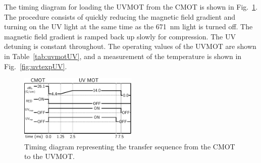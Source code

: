 The timing diagram for loading the UVMOT from the CMOT is shown
in Fig.~\ref{fig:timingUV}.  The procedure consists of quickly reducing the
magnetic field gradient and turning on the UV light at the same time as the
671~nm light is turned off.  The magnetic field gradient is ramped back up
slowly for compression.  The UV detuning is constant throughout.  The
operating values of the UVMOT are shown in Table~\ref{tab:uvmotUV}, and a
measurement of the temperature is shown in Fig.~\ref{fig:uvtexpUV}. 

\begin{figure} \centering
\includegraphics[width=0.5\textwidth]{../masters-figures/323mot/timingdiagram-nodet/timing.pdf}
\caption[UVMOT loading timing diagram]{\small Timing diagram representing the
transfer sequence from the CMOT to the UVMOT. } \label{fig:timingUV}
\end{figure}

\begin{table} \centering 
{}
\caption[UVMOT settings]{\small UVMOT Settings.
$\isat^{3P}=5.9\,\mathrm{mW/cm^{2}}$ is the saturation intensity of the 323~nm
transition.~\cite{Duarte2011}. The two values shown for the detuning correspond
to optimized number and temperature of the UVMOT (Fig.~\ref{fig:uvtexpUV}), and
optimized number of atoms loaded into the ODT.  More details on loading the ODT
will be given on \S\ref{sec:odtload}. }
\label{tab:uvmotUV} \end{table}

